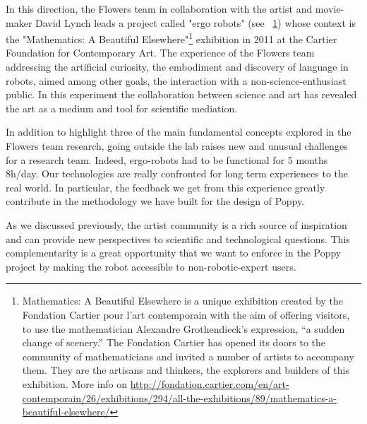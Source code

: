 In this direction, the Flowers team in collaboration with the artist and movie-maker David Lynch leads a project called "ergo robots" (see \figurename~\ref{fig:ergo_robot}) whose context is the "Mathematics: A Beautiful Elsewhere"\footnote{Mathematics: A Beautiful Elsewhere is a unique exhibition created by the Fondation Cartier pour l’art contemporain with the aim of offering visitors, to use the mathematician Alexandre Grothendieck’s expression, “a sudden change of scenery.” The Fondation Cartier has opened its doors to the community of mathematicians and invited a number of artists to accompany them. They are the artisans and thinkers, the explorers and builders of this exhibition. More info on \url{http://fondation.cartier.com/en/art-contemporain/26/exhibitions/294/all-the-exhibitions/89/mathematics-a-beautiful-elsewhere/}} exhibition in 2011 at the Cartier Foundation for Contemporary Art. The experience of the Flowers team addressing the artificial curiosity, the embodiment and discovery of language in robots, aimed among other goals, the interaction with a non-science-enthusiast public. In this experiment the collaboration between science and art has revealed the art as a medium and tool for scientific mediation.



\begin{figure}[]
\centering
    \hfil
    \caption{}
    \label{fig:ergo_robot}
\end{figure}

In addition to highlight three of the main fundamental concepts explored in the Flowers team research, going outside the lab raises new and unusual challenges for a research team. Indeed, ergo-robots had to be functional for 5 months 8h/day. Our technologies are really confronted for long term experiences to the real world. In particular, the feedback we get from this experience greatly contribute in the methodology we have built for the design of Poppy.


As we discussed previously, the artist community is a rich source of inspiration and can provide new perspectives to scientific and technological questions. This complementarity is a great opportunity that we want to enforce in the Poppy project by making the robot accessible to non-robotic-expert users.


